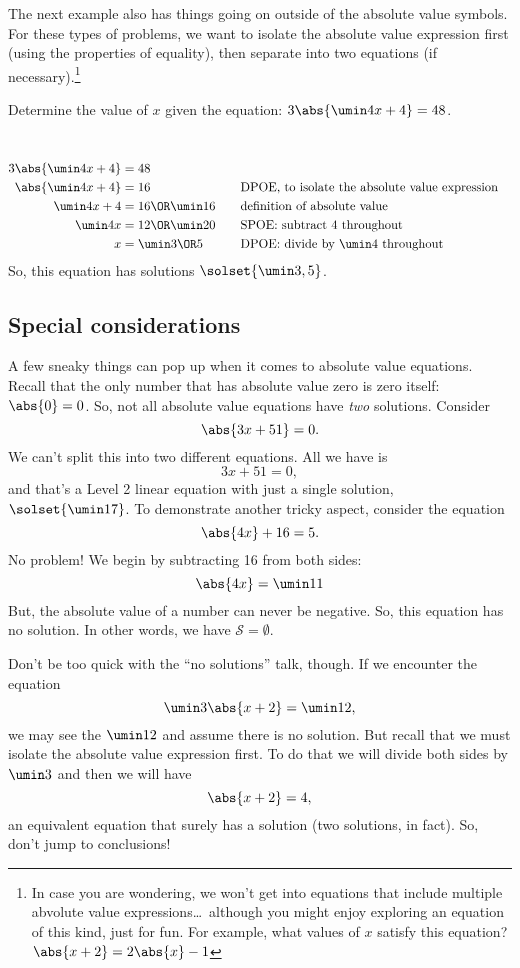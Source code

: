 The next example also has things going on outside of the absolute value symbols. For these types of problems, we want to isolate the absolute value expression first (using the properties of equality), then separate into two equations (if necessary).\footnote{In case you are wondering, we won't get into equations that include multiple abvolute value expressions\ldots\ although you might enjoy exploring an equation of this kind, just for fun. For example, what values of $x$ satisfy this equation? $\abs{x+2}=2\abs{x}-1$}

\begin{boxex}
Determine the value of $x$ given the equation: $3\abs{\umin4x+4} = 48$.

\exsoln\ 
\[\begin{aligned}
3\abs{\umin4x+4} &= 48\\
\abs{\umin4x+4} &= 16
&&\text{\quad DPOE, to isolate the absolute value expression}\\
\umin4x+4 &= 16 \OR \umin16
&&\text{\quad definition of absolute value}\\
\umin4x &= 12 \OR \umin20
&&\text{\quad SPOE: subtract 4 throughout}\\
x &= \umin3 \OR 5
&&\text{\quad DPOE: divide by $\umin4$ throughout}
\end{aligned}\]
So, this equation has solutions $\solset{\umin3, 5}$.
\end{boxex}

\subsection{Special considerations}

A few sneaky things can pop up when it comes to absolute value equations. Recall that the only number that has absolute value zero is zero itself: $\abs{0} = 0$. So, not all absolute value equations have \textit{two} solutions. Consider
\[\abs{3x + 51} = 0.\]
We can't split this into two different equations. All we have is
\[3x + 51 = 0,\]
and that's a Level 2 linear equation with just a single solution, $\solset{\umin17}$. To demonstrate another tricky aspect, consider the equation \[\abs{4x} + 16 = 5.\]
No problem! We begin by subtracting 16 from both sides:
\[\abs{4x} = \umin11\]
But, the absolute value of a number can never be negative. So, this equation has no solution. In other words, we have $\mathcal{S} = \emptyset$.

Don't be too quick with the ``no solutions'' talk, though. If we encounter the equation \[\umin3\abs{x + 2} = \umin12,\] we may see the $\umin12$ and assume there is no solution. But recall that we must isolate the absolute value expression first. To do that we will divide both sides by $\umin3$ and then we will have \[\abs{x+2} = 4,\] an equivalent equation that surely has a solution (two solutions, in fact). So, don't jump to conclusions!

